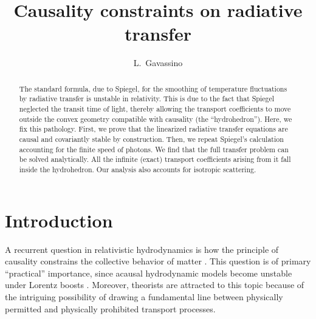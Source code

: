 \documentclass[a4paper, amsfonts, amssymb, amsmath, reprint, showkeys, nofootinbib, twoside,notitlepage,onecolumn]{revtex4-2}
\theoremstyle{definition}
\theoremstyle{theorem}
\theoremstyle{corollary}
\begin{document}
\title{Causality constraints on radiative transfer}
\author{ L.~Gavassino}


\begin{abstract}
The standard formula, due to Spiegel, for the smoothing of temperature fluctuations by radiative transfer is unstable in relativity. This is due to the fact that Spiegel neglected the transit time of light, thereby allowing the transport coefficients to move outside the convex geometry compatible with causality (the ``hydrohedron''). Here, we fix this pathology. First, we prove that the linearized radiative transfer equations are causal and covariantly stable by construction. Then, we repeat Spiegel's calculation accounting for the finite speed of photons. We find that the full transfer problem can be solved analytically. All the infinite (exact) transport coefficients arising from it fall inside the hydrohedron. Our analysis also accounts for isotropic scattering.
\end{abstract} 





\maketitle


\section{Introduction}\label{Introne}

A recurrent question in relativistic hydrodynamics is how the principle of causality constrains the collective behavior of matter \cite{Bludman1968,Susskind1969,Bludman:1970at,Israel_Stewart_1979,Diener:1996mj,Adams:2006sv,Israel_2009_inbook,PuKoide2009fj,Hippert:2024hum,Hui:2025aja}. This question is of primary ``practical'' importance, since acausal hydrodynamic models become unstable under Lorentz boosts \cite{GavassinoSuperluminal2021}. Moreover, theorists are attracted to this topic because of the intriguing possibility of drawing a fundamental line between physically permitted and physically prohibited transport processes.
\end{document}
